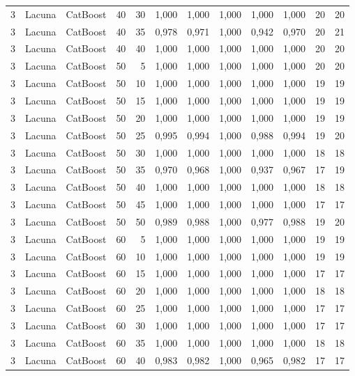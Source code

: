\begin{longtable}{@{}rllrrrrrrrrr@{}}
3 & Lacuna & CatBoost & 40 & 30 & 1,000 & 1,000 & 1,000 & 1,000 & 1,000 & 20 & 20 \\
3 & Lacuna & CatBoost & 40 & 35 & 0,978 & 0,971 & 1,000 & 0,942 & 0,970 & 20 & 21 \\
3 & Lacuna & CatBoost & 40 & 40 & 1,000 & 1,000 & 1,000 & 1,000 & 1,000 & 20 & 20 \\
3 & Lacuna & CatBoost & 50 & 5 & 1,000 & 1,000 & 1,000 & 1,000 & 1,000 & 20 & 20 \\
3 & Lacuna & CatBoost & 50 & 10 & 1,000 & 1,000 & 1,000 & 1,000 & 1,000 & 19 & 19 \\
3 & Lacuna & CatBoost & 50 & 15 & 1,000 & 1,000 & 1,000 & 1,000 & 1,000 & 19 & 19 \\
3 & Lacuna & CatBoost & 50 & 20 & 1,000 & 1,000 & 1,000 & 1,000 & 1,000 & 19 & 19 \\
3 & Lacuna & CatBoost & 50 & 25 & 0,995 & 0,994 & 1,000 & 0,988 & 0,994 & 19 & 20 \\
3 & Lacuna & CatBoost & 50 & 30 & 1,000 & 1,000 & 1,000 & 1,000 & 1,000 & 18 & 18 \\
3 & Lacuna & CatBoost & 50 & 35 & 0,970 & 0,968 & 1,000 & 0,937 & 0,967 & 17 & 19 \\
3 & Lacuna & CatBoost & 50 & 40 & 1,000 & 1,000 & 1,000 & 1,000 & 1,000 & 18 & 18 \\
3 & Lacuna & CatBoost & 50 & 45 & 1,000 & 1,000 & 1,000 & 1,000 & 1,000 & 17 & 17 \\
3 & Lacuna & CatBoost & 50 & 50 & 0,989 & 0,988 & 1,000 & 0,977 & 0,988 & 19 & 20 \\
3 & Lacuna & CatBoost & 60 & 5 & 1,000 & 1,000 & 1,000 & 1,000 & 1,000 & 19 & 19 \\
3 & Lacuna & CatBoost & 60 & 10 & 1,000 & 1,000 & 1,000 & 1,000 & 1,000 & 19 & 19 \\
3 & Lacuna & CatBoost & 60 & 15 & 1,000 & 1,000 & 1,000 & 1,000 & 1,000 & 17 & 17 \\
3 & Lacuna & CatBoost & 60 & 20 & 1,000 & 1,000 & 1,000 & 1,000 & 1,000 & 18 & 18 \\
3 & Lacuna & CatBoost & 60 & 25 & 1,000 & 1,000 & 1,000 & 1,000 & 1,000 & 17 & 17 \\
3 & Lacuna & CatBoost & 60 & 30 & 1,000 & 1,000 & 1,000 & 1,000 & 1,000 & 17 & 17 \\
3 & Lacuna & CatBoost & 60 & 35 & 1,000 & 1,000 & 1,000 & 1,000 & 1,000 & 18 & 18 \\
3 & Lacuna & CatBoost & 60 & 40 & 0,983 & 0,982 & 1,000 & 0,965 & 0,982 & 17 & 17 \\

\end{longtable}
